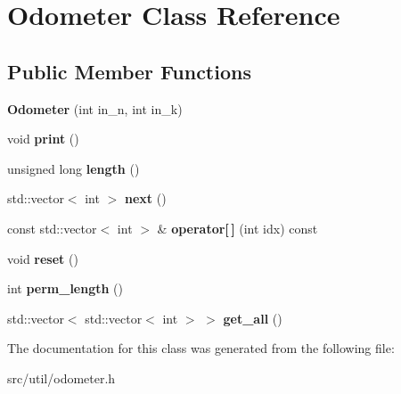 \hypertarget{class_odometer}{}\section{Odometer Class Reference}
\label{class_odometer}
\subsection*{Public Member Functions}
\begin{DoxyCompactItemize}
\item 
\mbox{\label{class_odometer_a01675e615335239ff37909d74fec57ce}} 
{\bfseries Odometer} (int in\+\_\+n, int in\+\_\+k)
\item 
\mbox{\label{class_odometer_a182297f889f24d71a1cd3c954175007e}} 
void {\bfseries print} ()
\item 
\mbox{\label{class_odometer_abcba3abd2b2c04cb31ddd40c490b3093}} 
unsigned long {\bfseries length} ()
\item 
\mbox{\label{class_odometer_a7870a18bd060d8e4f6a2ff22bf54a326}} 
std\+::vector$<$ int $>$ {\bfseries next} ()
\item 
\mbox{\label{class_odometer_a0e7acb1f11f004d8e5414d15b833ecd7}} 
const std\+::vector$<$ int $>$ \& {\bfseries operator\mbox{[}$\,$\mbox{]}} (int idx) const
\item 
\mbox{\label{class_odometer_a2995d1d19b0d2d4d214b71dd49e153ef}} 
void {\bfseries reset} ()
\item 
\mbox{\label{class_odometer_af63ecac3d0e869a9a20044238f5064bf}} 
int {\bfseries perm\+\_\+length} ()
\item 
\mbox{\label{class_odometer_a5c10257afd62f76109805c2ae426b443}} 
std\+::vector$<$ std\+::vector$<$ int $>$ $>$ {\bfseries get\+\_\+all} ()
\end{DoxyCompactItemize}


The documentation for this class was generated from the following file\+:\begin{DoxyCompactItemize}
\item 
src/util/odometer.\+h\end{DoxyCompactItemize}

